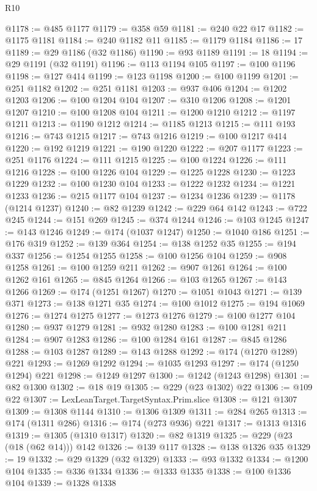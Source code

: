 \begin{lexlean}{R10}
\begin{coremodule}
@1178 := @485 @1177
@1179 := @358 @59
@1181 := @240 @22 @17
@1182 := @1175 @1181
@1184 := @240 @1182 @11
@1185 := @1179 @1184
@1186 := 17
@1189 := @29 @1186 (@32 @1186)
@1190 := @93 @1189
@1191 := 18
@1194 := @29 @1191 (@32 @1191)
@1196 := @113 @1194 @105
@1197 := @100 @1196
@1198 := @127 @414
@1199 := @123 @1198
@1200 := @100 @1199
@1201 := @251 @1182
@1202 := @251 @1181
@1203 := @937 @406
@1204 := @1202 @1203
@1206 := @100 @1204 @104
@1207 := @310 @1206
@1208 := @1201 @1207
@1210 := @100 @1208 @104
@1211 := @1200 @1210
@1212 := @1197 @1211
@1213 := @1190 @1212
@1214 := @1185 @1213
@1215 := @111 @193
@1216 := @743 @1215
@1217 := @743 @1216
@1219 := @100 @1217 @414
@1220 := @192 @1219
@1221 := @190 @1220
@1222 := @207 @1177
@1223 := @251 @1176
@1224 := @111 @1215
@1225 := @100 @1224
@1226 := @111 @1216
@1228 := @100 @1226 @104
@1229 := @1225 @1228
@1230 := @1223 @1229
@1232 := @100 @1230 @104
@1233 := @1222 @1232
@1234 := @1221 @1233
@1236 := @215 @1177 @104
@1237 := @1234 @1236
@1239 := @1178 (@1214 @1237)
@1240 := @82 @1239
@1242 := @229 @64 @142
@1243 := @722 @245
@1244 := @151 @269
@1245 := @374 @1244
@1246 := @103 @1245
@1247 := @143 @1246
@1249 := @174 (@1037 @1247)
@1250 := @1040 @186
@1251 := @176 @319
@1252 := @139 @364
@1254 := @138 @1252 @35
@1255 := @194 @337
@1256 := @1254 @1255
@1258 := @100 @1256 @104
@1259 := @908 @1258
@1261 := @100 @1259 @211
@1262 := @907 @1261
@1264 := @100 @1262 @161
@1265 := @845 @1264
@1266 := @103 @1265
@1267 := @143 @1266
@1269 := @174 (@1251 @1267)
@1270 := @1051 @1043
@1271 := @139 @371
@1273 := @138 @1271 @35
@1274 := @100 @1012
@1275 := @194 @1069
@1276 := @1274 @1275
@1277 := @1273 @1276
@1279 := @100 @1277 @104
@1280 := @937 @1279
@1281 := @932 @1280
@1283 := @100 @1281 @211
@1284 := @907 @1283
@1286 := @100 @1284 @161
@1287 := @845 @1286
@1288 := @103 @1287
@1289 := @143 @1288
@1292 := @174 (@1270 @1289) @221
@1293 := @1269 @1292
@1294 := @1035 @1293
@1297 := @174 (@1250 @1294) @221
@1298 := @1249 @1297
@1300 := @1242 (@1243 @1298)
@1301 := @82 @1300
@1302 := @18 @19
@1305 := @229 (@23 @1302) @22
@1306 := @109 @22
@1307 := LexLeanTarget.TargetSyntax.Prim.slice
@1308 := @121 @1307
@1309 := @1308 @1144
@1310 := @1306 @1309
@1311 := @284 @265
@1313 := @174 (@1311 @286)
@1316 := @174 (@273 @936) @221
@1317 := @1313 @1316
@1319 := @1305 (@1310 @1317)
@1320 := @82 @1319
@1325 := @229 (@23 (@18 (@62 @14))) @142
@1326 := @139 @117
@1328 := @138 @1326 @35
@1329 := 19
@1332 := @29 @1329 (@32 @1329)
@1333 := @93 @1332
@1334 := @1200 @104
@1335 := @336 @1334
@1336 := @1333 @1335
@1338 := @100 @1336 @104
@1339 := @1328 @1338

\end{coremodule}
\end{lexlean}
